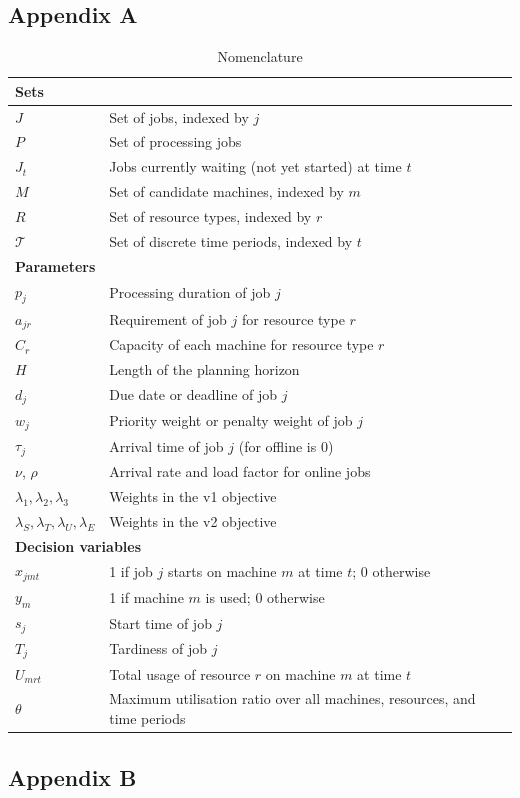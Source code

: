 \documentclass[12pt]{article}
\begin{document}
\subsection{Appendix A}\label{sec:AppendixA}
\begin{table}[htbp]
\centering
\caption{Nomenclature}
\label{tab:nomenclature}
\begin{tabular}{ll}
\hline
\multicolumn{2}{l}{\textbf{Sets}}\\
\hline
$J$ & Set of jobs, indexed by $j$ \\
$P$ & Set of processing jobs \\
$J_t$ & Jobs currently waiting (not yet started) at time $t$ \\
$M$ & Set of candidate machines, indexed by $m$ \\
$R$ & Set of resource types, indexed by $r$ \\
$\mathcal{T}$ & Set of discrete time periods, indexed by $t$ \\
\hline
\multicolumn{2}{l}{\textbf{Parameters}}\\
\hline
$p_j$ & Processing duration of job $j$ \\
$a_{jr}$ & Requirement of job $j$ for resource type $r$ \\
$C_r$ & Capacity of each machine for resource type $r$ \\
$H$ & Length of the planning horizon \\
$d_j$ & Due date or deadline of job $j$ \\
$w_j$ & Priority weight or penalty weight of job $j$ \\
$\tau_j$ & Arrival time of job $j$ (for offline is $0$) \\
$\nu$, $\rho$ & Arrival rate and load factor for online jobs \\
$\lambda_1,\lambda_2,\lambda_3$ & Weights in the v1 objective \\
$\lambda_S,\lambda_T,\lambda_U,\lambda_E$ & Weights in the v2 objective \\
\hline
\multicolumn{2}{l}{\textbf{Decision variables}}\\
\hline
$x_{jmt}$ & 1 if job $j$ starts on machine $m$ at time $t$; 0 otherwise \\
$y_m$ & 1 if machine $m$ is used; 0 otherwise \\
$s_j$ & Start time of job $j$ \\
$T_j$ & Tardiness of job $j$ \\
$U_{mrt}$ & Total usage of resource $r$ on machine $m$ at time $t$ \\
$\theta$ & Maximum utilisation ratio over all machines, resources, and time periods \\
\hline
\end{tabular}
\end{table}

\subsection{Appendix B}\label{sec:AppendixB}
\end{document}
